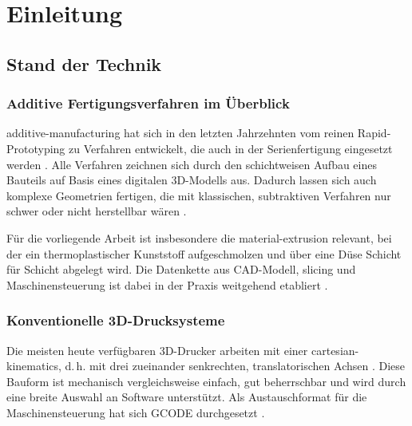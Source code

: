 \chapter{Einleitung}\label{chap:introduction}
    \section{Stand der Technik}\label{sec:state-of-the-art}
        \subsection{Additive Fertigungsverfahren im Überblick}\label{subsec:additive-manufacturing-overview}
            \Gls{additive-manufacturing} hat sich in den letzten Jahrzehnten vom reinen Rapid-Prototyping zu Verfahren entwickelt, die auch in der Serienfertigung eingesetzt werden \autocite[vgl.][S.~335--336]{urhalRobotAssistedAdditive2019}.
            Alle Verfahren zeichnen sich durch den schichtweisen Aufbau eines Bauteils auf Basis eines digitalen 3D-Modells aus.
            Dadurch lassen sich auch komplexe Geometrien fertigen, die mit klassischen, subtraktiven Verfahren nur schwer oder nicht herstellbar wären \autocite[vgl.][S.~2785--2786]{nayyeriPlanarNonplanarSlicing2022}.

            Für die vorliegende Arbeit ist insbesondere die \gls{material-extrusion} relevant, bei der ein thermoplastischer Kunststoff aufgeschmolzen und über eine Düse Schicht für Schicht abgelegt wird.
            Die Datenkette aus \ac{CAD}-Modell, \gls{slicing} und Maschinensteuerung ist dabei in der Praxis weitgehend etabliert \autocite[vgl.][S.~3768--3770]{lettoriReviewGeometryRepresentation2022}.

        \subsection{Konventionelle 3D-Drucksysteme}\label{subsec:conventional-3d-printing-systems}
            Die meisten heute verfügbaren 3D-Drucker arbeiten mit einer \gls{cartesian-kinematics}, d.\,h. mit drei zueinander senkrechten, translatorischen Achsen \autocite[vgl.][S.~2787--2789]{nayyeriPlanarNonplanarSlicing2022}.
            Diese Bauform ist mechanisch vergleichsweise einfach, gut beherrschbar und wird durch eine breite Auswahl an Software unterstützt.
            Als Austauschformat für die Maschinensteuerung hat sich \ac{GCODE} durchgesetzt \autocite[vgl.][S.~2549--2551]{latifReviewCodeSTEP2021}.

